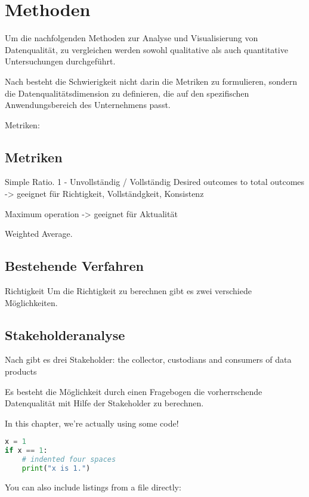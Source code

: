 \chapter{Methoden}\label{ch:method}
Um die nachfolgenden Methoden zur Analyse und Visualisierung von Datenqualität, zu vergleichen werden sowohl qualitative als auch quantitative Untersuchungen durchgeführt.

Nach \cite{pipino2002} besteht die Schwierigkeit nicht darin die Metriken zu formulieren, sondern die Datenqualitätsdimension zu definieren, die auf den spezifischen Anwendungsbereich des Unternehmens passt. 

Metriken:


\section{Metriken}
Simple Ratio. 1 - Unvollständig / Vollständig
Desired outcomes to total outcomes 
-> geeignet für Richtigkeit, Vollständgkeit, Konsistenz


Maximum operation
-> geeignet für Aktualität

Weighted Average. 


\section{Bestehende Verfahren}
Richtigkeit
Um die Richtigkeit zu berechnen gibt es zwei verschiede Möglichkeiten. 


\section{Stakeholderanalyse}
Nach \cite{pipino2002} gibt es drei Stakeholder: the collector, custodians and consumers of data products

Es besteht die Möglichkeit durch einen Fragebogen die vorherrschende Datenqualität mit Hilfe der Stakeholder zu berechnen. \cite{pipino2002}


In this chapter, we're actually using some code!

\begin{lstlisting}[language=Python,caption={This is an example of inline listing},captionpos=b]
x = 1
if x == 1:
    # indented four spaces
    print("x is 1.")

\end{lstlisting}

You can also include listings from a file directly:


